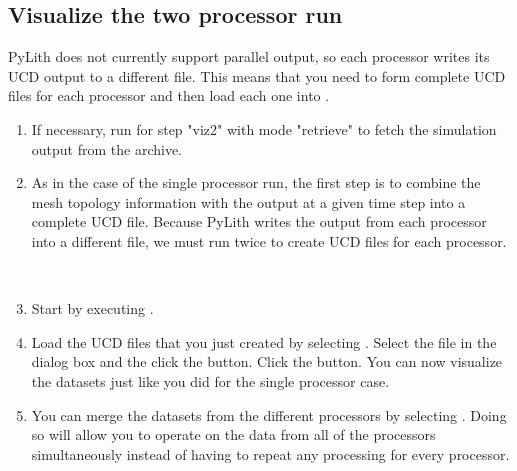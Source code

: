 \subsection{Visualize the two processor run}

PyLith does not currently support parallel output, so each processor
writes its UCD output to a different file. This means that you need to
form complete UCD files for each processor and then load each one into
.

\begin{enumerate}
\item If necessary, run  for step "viz2" with mode
  "retrieve" to fetch the simulation output from the archive.

  \begin{screen}
    \shellprompt{}
  \end{screen}
  
\item As in the case of the single processor run, the first step is to
  combine the mesh topology information with the output at a given
  time step into a complete UCD file. Because PyLith writes the output
  from each processor into a different file, we must run 
  twice to create UCD files for each processor.

  \begin{screen}
    \shellprompt{} \\
    \shellprompt{}
  \end{screen}

\item Start  by executing .

  \begin{screen}
    \shellprompt{}
  \end{screen}
  
\item Load the UCD files that you just created by selecting
  \guiselect{}. Select the file in
  the dialog box and the click the  button. Click the
   button. You can now visualize the datasets just
  like you did for the single processor case.
\item You can merge the datasets from the different processors by
  selecting \guiselect{}. Doing so
  will allow you to operate on the data from all of the processors
  simultaneously instead of having to repeat any processing for every
  processor.
\end{enumerate}
